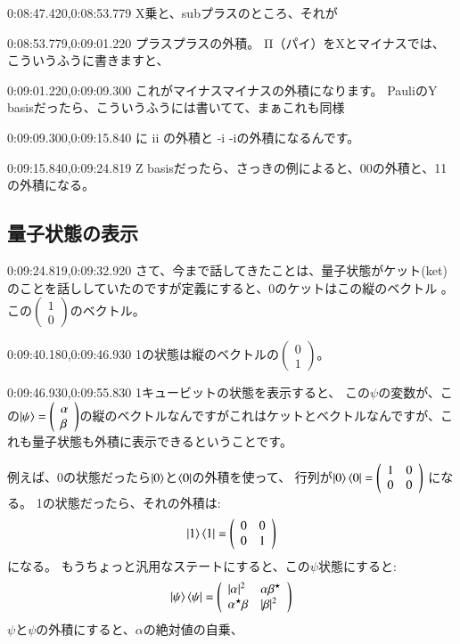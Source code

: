 0:08:47.420,0:08:53.779
X乗と、subプラスのところ、それが

0:08:53.779,0:09:01.220
プラスプラスの外積。
Π（パイ）をXとマイナスでは、こういうふうに書きますと、

0:09:01.220,0:09:09.300
これがマイナスマイナスの外積になります。
PauliのY basisだったら、こういうふうには書いてて、まぁこれも同様

0:09:09.300,0:09:15.840
に ii の外積と -i -iの外積になるんです。

0:09:15.840,0:09:24.819
Z basisだったら、さっきの例によると、00の外積と、11の外積になる。
\fi
\subsection{量子状態の表示}
0:09:24.819,0:09:32.920
さて、今まで話してきたことは、量子状態がケット(ket)のことを話ししていたのですが定義にすると、0のケットはこの縦のベクトル 。この$\left(\begin{array}{l}
1 \\
0
\end{array}\right)$のベクトル。

0:09:40.180,0:09:46.930
1の状態は縦のベクトルの$\left(\begin{array}{l}
0 \\
1
\end{array}\right)$。

0:09:46.930,0:09:55.830
1キュービットの状態を表示すると、
この$\psi$の変数が、この$\ket{\psi} = \left(\begin{array}{l}
\alpha \\
\beta
\end{array}\right)$の縦のベクトルなんですがこれはケットとベクトルなんですが、これも量子状態も外積に表示できるということです。

例えば、0の状態だったら$\ket{0}$と$\bra{0}$の外積を使って、
行列が$\ket{0}\bra{0}=\left(\begin{array}{ll}
1 & 0 \\
0 & 0
\end{array}\right)$ になる。
1の状態だったら、それの外積は:
\begin{equation}
    \ket{1}\bra{1}=\left(\begin{array}{ll}
0 & 0 \\
0 & 1
\end{array}\right) 
\end{equation}
になる。
もうちょっと汎用なステートにすると、この$\psi$状態にすると:
\begin{equation}
    \ket{\psi}\bra{\psi}=\left(\begin{array}{ll}
|\alpha|^2 & \alpha\beta^{\star} \\
\alpha^{\star}\beta & |\beta|^2
\end{array}\right) 
\end{equation}
\iffalse
$\psi$と$\psi$の外積にすると、$\alpha$の絶対値の自乗、

